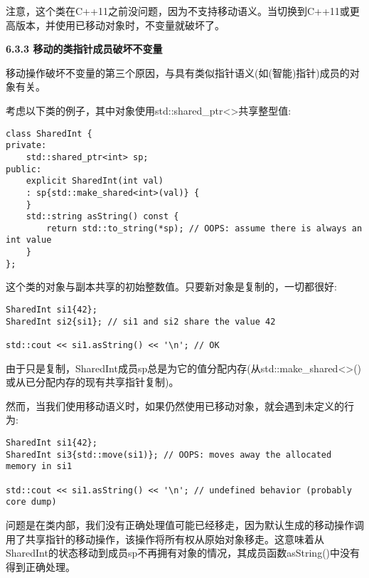 注意，这个类在C++11之前没问题，因为不支持移动语义。当切换到C++11或更高版本，并使用已移动对象时，不变量就破坏了。\par

\hspace*{\fill} \par %
\textbf{6.3.3 移动的类指针成员破坏不变量}

移动操作破坏不变量的第三个原因，与具有类似指针语义(如(智能)指针)成员的对象有关。\par

考虑以下类的例子，其中对象使用std::shared\_ptr<>共享整型值:\par

\begin{lstlisting}[caption={}]
class SharedInt {
private:
	std::shared_ptr<int> sp;
public:
	explicit SharedInt(int val)
	: sp{std::make_shared<int>(val)} {
	}
	std::string asString() const {
		return std::to_string(*sp); // OOPS: assume there is always an int value
	}
};
\end{lstlisting}

这个类的对象与副本共享的初始整数值。只要新对象是复制的，一切都很好:\par

\begin{lstlisting}[caption={}]
SharedInt si1{42};
SharedInt si2{si1}; // si1 and si2 share the value 42

std::cout << si1.asString() << '\n'; // OK
\end{lstlisting}

由于只是复制，SharedInt成员sp总是为它的值分配内存(从std::make\_shared<>()或从已分配内存的现有共享指针复制)。\par

然而，当我们使用移动语义时，如果仍然使用已移动对象，就会遇到未定义的行为:\par

\begin{lstlisting}[caption={}]
SharedInt si1{42};
SharedInt si3{std::move(si1)}; // OOPS: moves away the allocated memory in si1

std::cout << si1.asString() << '\n'; // undefined behavior (probably core dump)
\end{lstlisting}

问题是在类内部，我们没有正确处理值可能已经移走，因为默认生成的移动操作调用了共享指针的移动操作，该操作将所有权从原始对象移走。这意味着从SharedInt的状态移动到成员sp不再拥有对象的情况，其成员函数asString()中没有得到正确处理。\par

